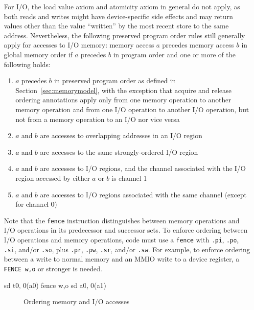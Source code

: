 For I/O, the load value axiom and atomicity axiom in general do not apply, as both reads and writes might have device-specific side effects and may return values other than the value ``written'' by the most recent store to the same address.
Nevertheless, the following preserved program order rules still generally apply for accesses to I/O memory:
memory access $a$ precedes memory access $b$ in global memory order if $a$ precedes $b$ in program order and one or more of the following holds:
\begin{enumerate}
  \item $a$ precedes $b$ in preserved program order as defined in Section~\ref{sec:memorymodel}, with the exception that acquire and release ordering annotations apply only from one memory operation to another memory operation and from one I/O operation to another I/O operation, but not from a memory operation to an I/O nor vice versa
  \item $a$ and $b$ are accesses to overlapping addresses in an I/O region
  \item $a$ and $b$ are accesses to the same strongly-ordered I/O region
  \item $a$ and $b$ are accesses to I/O regions, and the channel associated with the I/O region accessed by either $a$ or $b$ is channel 1
  \item $a$ and $b$ are accesses to I/O regions associated with the same channel (except for channel 0)
\end{enumerate}

Note that the {\tt fence} instruction distinguishes between memory operations and I/O operations in its predecessor and successor sets.
To enforce ordering between I/O operations and memory operations, code must use a {\tt fence} with {\tt .pi}, {\tt .po}, {\tt .si}, and/or {\tt .so}, plus {\tt .pr}, {\tt .pw}, {\tt .sr}, and/or {\tt .sw}.
For example, to enforce ordering between a write to normal memory and an MMIO write to a device register, a {\tt FENCE w,o} or stronger is needed.

\begin{verbbox}
  sd t0, 0(a0)
  fence w,o
  sd a0, 0(a1)
\end{verbbox}
\begin{figure}[h!]
  \centering\small
  \theverbbox
  \caption{Ordering memory and I/O accesses}
  \label{fig:litmus:wo}
\end{figure}


